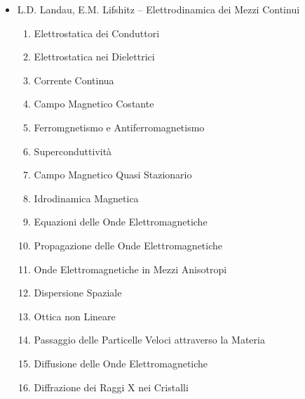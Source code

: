 \begin{itemize}

\item L.D. Landau, E.M. Lifshitz -- Elettrodinamica dei Mezzi Continui
\begin{enumerate}
\setcounter{enumi}{0}
\item Elettrostatica dei Conduttori
\item Elettrostatica nei Dielettrici
\item Corrente Continua
\item Campo Magnetico Costante
\item Ferromgnetismo e Antiferromagnetismo
\item Superconduttività
\item Campo Magnetico Quasi Stazionario
\item Idrodinamica Magnetica
\item Equazioni delle Onde Elettromagnetiche
\item Propagazione delle Onde Elettromagnetiche
\item Onde Elettromagnetiche in Mezzi Anisotropi
\item Dispersione Spaziale
\item Ottica non Lineare
\item Passaggio delle Particelle Veloci attraverso la Materia
\item Diffusione delle Onde Elettromagnetiche
\item Diffrazione dei Raggi X nei Cristalli
\end{enumerate}

\end{itemize}

